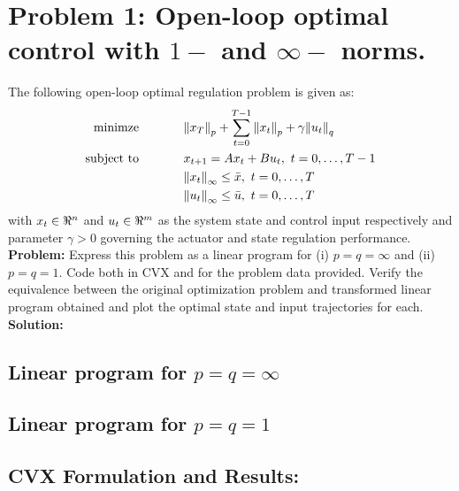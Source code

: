 \documentclass[letter]{article}
\begin{document}
\section{Problem 1: Open-loop optimal control with $1-$ and $\infty-$ norms.}
The following open-loop optimal regulation problem is given as:
\begin{equation}\label{eq:open-loop_opt-control_def}
	\begin{aligned}
		\text{minimze} \hspace{0.5in}&\norm{x_T}_p + \sum_{t = 0}^{T-1} \norm{x_t}_p + \gamma\norm{u_t}_q\\
		\text{subject to} \hspace{0.5in} 	& x_{t+1} = A x_t + B u_t, \ t = 0,\dots,T-1\\
							& \norm{x_t}_\infty \leq \bar{x}, \ t = 0,\dots,T\\
							 & \norm{u_t}_\infty \leq \bar{u}, \ t = 0,\dots,T
	\end{aligned}
\end{equation}
with $x_t \in \real^n$ and $u_t \in \real^m$ as the system state and control input respectively and parameter $\gamma > 0$ governing the actuator and state regulation performance.\\

\textbf{Problem:}
Express this problem as a linear program for (i) $p=q=\infty$ and (ii) $p=q=1$. Code both in CVX and for the problem data provided. Verify the equivalence between the original optimization problem and transformed linear program obtained and plot the optimal state and input trajectories for each.\\

\textbf{Solution:}
\subsection{Linear program for $p = q = \infty$}





\subsection{Linear program for $p = q = 1$}





\subsection{CVX Formulation and Results:}
\end{document}
